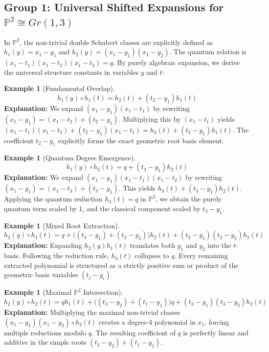 \documentclass{amsart}
\theoremstyle{definition}
\newtheorem{example}[theorem]{Example}
\begin{document}
\subsection*{Group 1: Universal Shifted Expansions for $\mathbb{P}^2 \cong Gr(1,3)$}
In $\mathbb{P}^2$, the non-trivial double Schubert classes are explicitly defined as $h_1(y) = x_1 - y_1$ and $h_2(y) = (x_1 - y_1)(x_1 - y_2)$. The quantum relation is $(x_1 - t_1)(x_1 - t_2)(x_1 - t_3) = q$. By purely algebraic expansion, we derive the universal structure constants in variables $y$ and $t$:
\begin{example}[Fundamental Overlap]
$$ h_1(y) \circ h_1(t) = h_2(t) + (t_2 - y_1) h_1(t) $$
\textbf{Explanation:} We expand $(x_1 - y_1)(x_1 - t_1)$ by rewriting $(x_1 - y_1) = (x_1 - t_2) + (t_2 - y_1)$. Multiplying this by $(x_1 - t_1)$ yields $(x_1 - t_1)(x_1 - t_2) + (t_2 - y_1)(x_1 - t_1) = h_2(t) + (t_2 - y_1) h_1(t)$. The coefficient $t_2 - y_1$ explicitly forms the exact geometric root basis element.
\end{example}

\begin{example}[Quantum Degree Emergence]
$$ h_1(y) \circ h_2(t) = q + (t_3 - y_1) h_2(t) $$
\textbf{Explanation:} We expand $(x_1 - y_1)(x_1 - t_1)(x_1 - t_2)$ by rewriting $(x_1 - y_1) = (x_1 - t_3) + (t_3 - y_1)$. This yields $h_3(t) + (t_3 - y_1)h_2(t)$. Applying the quantum reduction $h_3(t) = q$ in $\mathbb{P}^2$, we obtain the purely quantum term scaled by 1, and the classical component scaled by $t_3 - y_1$.
\end{example}

\begin{example}[Mixed Root Extraction]
$$ h_2(y) \circ h_1(t) = q + \big((t_3 - y_1) + (t_2 - y_2)\big) h_2(t) + (t_2 - y_1)(t_2 - y_2) h_1(t) $$
\textbf{Explanation:} Expanding $h_2(y)h_1(t)$ translates both $y_1$ and $y_2$ into the $t$-basis. Following the reduction rule, $h_3(t)$ collapses to $q$. Every remaining extracted polynomial is structured as a strictly positive sum or product of the geometric basis variables $(t_j - y_i)$.
\end{example}

\begin{example}[Maximal $\mathbb{P}^2$ Intersection]
$$ h_2(y) \circ h_2(t) = q h_1(t) + \big((t_3 - y_2) + (t_1 - y_1)\big) q + (t_3 - y_1)(t_3 - y_2) h_2(t) $$
\textbf{Explanation:} Multiplying the maximal non-trivial classes $(x_1 - y_1)(x_1 - y_2) \circ h_2(t)$ creates a degree-4 polynomial in $x_1$, forcing multiple reductions modulo $q$. The resulting coefficient of $q$ is perfectly linear and additive in the simple roots $(t_3 - y_2) + (t_1 - y_1)$.
\end{example}
\end{document}
